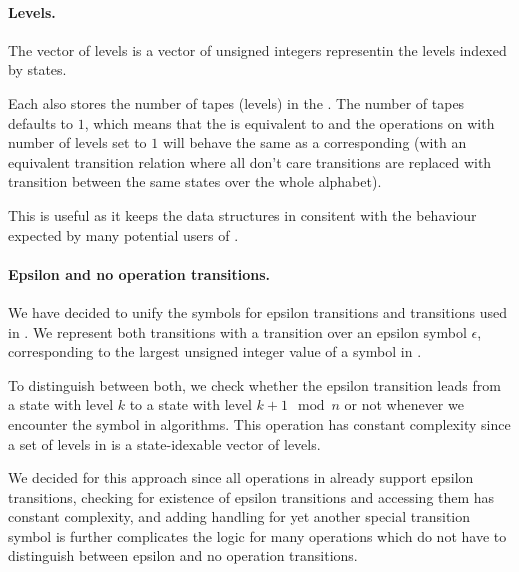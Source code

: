 \paragraph{Levels.}
The vector of levels is a vector of unsigned integers representin the levels indexed by states.

Each \nft also stores the number of tapes (levels) in the \nft.
The number of tapes defaults to $1$, which means that the \nft is equivalent to \nfa and the operations on \nfts with number of levels set to $1$ will behave the same as a corresponding \nfa (with an equivalent transition relation where all don't care transitions are replaced with transition between the same states over the whole alphabet).

This is useful as it keeps the data structures in \mata consitent with the behaviour expected by many potential users of \mata.

\paragraph{Epsilon and no operation transitions.}
We have decided to unify the symbols for epsilon transitions and \nop transitions used in \mata.
We represent both transitions with a transition over an epsilon symbol $\epsilon$, corresponding to the largest unsigned integer value of a symbol in \mata.

To distinguish between both, we check whether the epsilon transition leads from a state with level $k$ to a state with level $k + 1 \mod n$ or not whenever we encounter the symbol in algorithms.
This operation has constant complexity since a set of levels in \mata is a state-idexable vector of levels.

We decided for this approach since all operations in \mata already support epsilon transitions, checking for existence of epsilon transitions and accessing them has constant complexity, and adding handling for yet another special transition symbol is further complicates the logic for many operations which do not have to distinguish between epsilon and no operation transitions.

